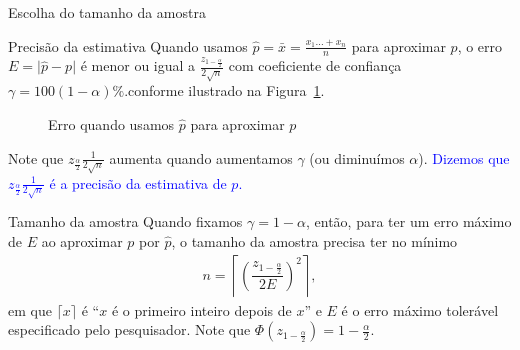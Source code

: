 \documentclass[8pt]{beamer}
\begin{document}
\begin{frame}{Escolha do tamanho da amostra}

\scriptsize

\begin{block}{Precisão da estimativa}
	Quando usamos $\hat{p} = \bar{x} = \frac{x_1 \dots + x_n}{n}$ para aproximar $p$, o erro $E = \lvert \hat{p} - p \rvert$ é menor ou igual a $ \frac{z_{1-\frac{\alpha}{2}} }{2\sqrt{n}}$ com coeficiente de confiança $\gamma = 100(1-\alpha)\%$.conforme  ilustrado na Figura~\ref{fig:intervalo_conf_prop}.
	
	\begin{figure}
		\centering
		\caption{Erro quando usamos $\hat{p}$ para aproximar $p$}
		\label{fig:intervalo_conf_prop}
	\end{figure}
	Note que $z_\frac{\alpha}{2} \frac{1}{2\sqrt{n}}$ aumenta quando aumentamos $\gamma$ (ou diminuímos $\alpha$).  \textcolor{blue}{Dizemos que $z_\frac{\alpha}{2} \frac{1}{2\sqrt{n}}$ é a precisão da estimativa de $p$.}
\end{block}

\begin{block}{Tamanho da amostra}
	Quando fixamos $\gamma=1-\alpha$, então, para ter um erro máximo de $E$ ao aproximar $p$ por $\hat{p}$, o tamanho da amostra precisa ter no mínimo 
	\begin{align*}
	n = \left\lceil \left( \dfrac{z_{1-\frac{\alpha}{2}}  }{2E} \right)^2 \right\rceil,
	\end{align*}
	em que $\lceil x \rceil$ é ``$x$ é o primeiro inteiro depois de $x$'' e $E$ é o erro máximo tolerável especificado pelo pesquisador. Note que $\Phi\left(z_{1-\frac{\alpha}{2}}\right) = 1- \frac{\alpha}{2}$.
\end{block}

\normalsize

\end{frame}
\end{document}
